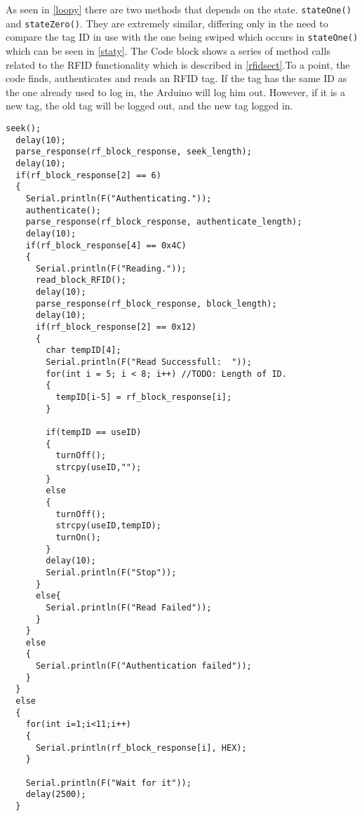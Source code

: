 As seen in \autoref{loopy} there are two methods that depends on the state. \verb|stateOne()| and \verb|stateZero()|. They are extremely similar, differing only in the need to compare the tag ID in use with the one being swiped which occurs in \verb|stateOne()| which can be seen in \autoref{staty}. The Code block shows a series of method calls related to the RFID functionality which is described in \autoref{rfidsect}.\newline To a point, the code finds, authenticates and reads an RFID tag. If the tag has the same ID as the one already used to log in, the Arduino will log him out. However, if it is a new tag, the old tag will be logged out, and the new tag logged in.
\begin{lstlisting}[frame=single, label=staty, caption=The Arduino state one code.]
  seek();
  delay(10);
  parse_response(rf_block_response, seek_length);
  delay(10);
  if(rf_block_response[2] == 6)
  {
    Serial.println(F("Authenticating."));
    authenticate();
    parse_response(rf_block_response, authenticate_length);
    delay(10);
    if(rf_block_response[4] == 0x4C)
    {
      Serial.println(F("Reading."));
      read_block_RFID();
      delay(10);
      parse_response(rf_block_response, block_length);
      delay(10);
      if(rf_block_response[2] == 0x12)
      {
        char tempID[4];
        Serial.println(F("Read Successfull:  "));
        for(int i = 5; i < 8; i++) //TODO: Length of ID.
        {        
          tempID[i-5] = rf_block_response[i];
        } 
        
        if(tempID == useID)
        {
          turnOff();
          strcpy(useID,"");
        }
        else
        {
          turnOff();
          strcpy(useID,tempID);
          turnOn();
        }
        delay(10);
        Serial.println(F("Stop"));
      }
      else{
        Serial.println(F("Read Failed"));
      }
    }
    else
    {
      Serial.println(F("Authentication failed"));
    }
  }
  else
  {
    for(int i=1;i<11;i++)
    {
      Serial.println(rf_block_response[i], HEX);
    }
    
    Serial.println(F("Wait for it"));  
    delay(2500);
  }
\end{lstlisting}